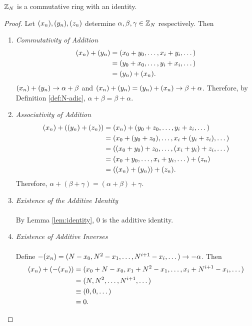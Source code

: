 \begin{theorem}
  $\mathbb{Z}_N$ is a commutative ring with an identity.
\end{theorem}
\begin{proof}
  Let $(x_n),(y_n),(z_n)$ determine $\alpha,\beta,\gamma\in\mathbb{Z}_N$ respectively. Then
  \begin{enumerate}
    \item {\em Commutativity of Addition}
      \begin{align*}
            (x_n)+(y_n)&=(x_0+y_0,\dots,x_i+y_i,\dots) \\
                   &=(y_0+x_0,\dots,y_i+x_i,\dots) \\
                   &=(y_n)+(x_n).
      \end{align*}
      $(x_n)+(y_n) \rightarrow \alpha+\beta$ and $(x_n)+(y_n)=(y_n)+(x_n) \rightarrow \beta+\alpha$.
      Therefore, by Definition \ref{def:N-adic}, $\alpha+\beta=\beta+\alpha$.
    \item {\em Associativity of Addition}
      \begin{align*}
        (x_n)+((y_n)+(z_n))&=(x_n)+(y_0+z_0,\dots,y_i+z_i,\dots) \\
                     &=(x_0+(y_0+z_0),\dots,x_i+(y_i+z_i),\dots) \\
                     &=((x_0+y_0)+z_0,\dots,(x_i+y_i)+z_i,\dots) \\
                     &=(x_0+y_0,\dots,x_i+y_i,\dots)+(z_n) \\
                     &=((x_n)+(y_n))+(z_n).
      \end{align*}
      Therefore, $\alpha+(\beta+\gamma)=(\alpha+\beta)+\gamma$.
    \item {\em Existence of the Additive Identity}
      \\ \\
      By Lemma \ref{lem:identity}, $0$ is the additive identity.
    \item {\em Existence of Additive Inverses}
      \\ \\
      Define $-(x_n) = (N-x_0,N^2-x_1,\dots,N^{i+1}-x_i,\dots) \rightarrow -\alpha$.
      Then
      \begin{align*}
        (x_n)+(-(x_n))&=(x_0+N-x_0,x_1+N^2-x_1,\dots,x_i+N^{i+1}-x_i,\dots) \\
                  &=(N,N^2,\dots,N^{i+1},\dots) \\
                  &\equiv(0,0,\dots) \\
                  &=0.
      \end{align*}

\end{enumerate}
\end{proof}
